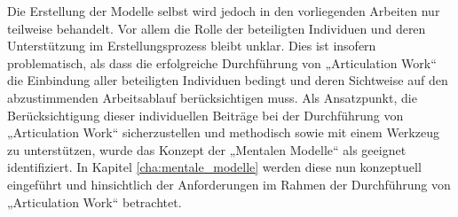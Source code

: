 Die Erstellung der Modelle selbst wird jedoch in den vorliegenden Arbeiten nur teilweise behandelt. Vor allem die Rolle der beteiligten Individuen und deren Unterstützung im Erstellungsprozess bleibt unklar. Dies ist insofern problematisch, als dass die erfolgreiche Durchführung von „Articulation Work“ die Einbindung aller beteiligten Individuen bedingt und deren Sichtweise auf den abzustimmenden Arbeitsablauf berücksichtigen muss. Als Ansatzpunkt, die Berücksichtigung dieser individuellen Beiträge bei der Durchführung von „Articulation Work“ sicherzustellen und methodisch sowie mit einem Werkzeug zu unterstützen, wurde das Konzept der „Mentalen Modelle“ als geeignet identifiziert. In Kapitel \ref{cha:mentale_modelle} werden diese nun konzeptuell eingeführt und hinsichtlich der Anforderungen im Rahmen der Durchführung von „Articulation Work“ betrachtet.


